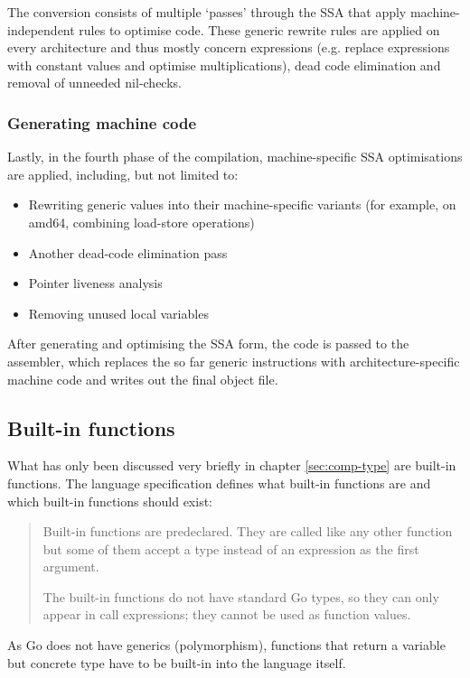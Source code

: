 The conversion consists of multiple `passes' through the SSA that
apply machine-independent rules to optimise code. These generic
rewrite rules are applied on every architecture and thus mostly
concern expressions (e.g. replace expressions with constant values and
optimise multiplications), dead code elimination and removal of unneeded
nil-checks.

\subsubsection{Generating machine code}

Lastly, in the fourth phase of the compilation, machine-specific
SSA optimisations are applied, including, but not limited to:
\begin{itemize}
    \item Rewriting generic values into their machine-specific variants
        (for example, on amd64, combining load-store operations)
    \item Another dead-code elimination pass
    \item Pointer liveness analysis
    \item Removing unused local variables
\end{itemize}

After generating and optimising the SSA form, the code is passed to the
assembler, which replaces the so far generic instructions with
architecture-specific machine code and writes out the final object file.
\autocite{compiler-readme}

\subsection{Built-in functions}

What has only been discussed very briefly in chapter \ref{sec:comp-type} are
built-in functions. The language specification defines what built-in functions
are and which built-in functions should exist:
\begin{quote}
    Built-in functions are predeclared. They are called like any other function
    but some of them accept a type instead of an expression as the first argument.

    The built-in functions do not have standard Go types, so they can only appear
    in call expressions; they cannot be used as function values.\autocite{go-spec-builtins}
\end{quote}

As Go does not have generics (polymorphism), functions that return a variable but
concrete type have to be built-in into the language itself.

